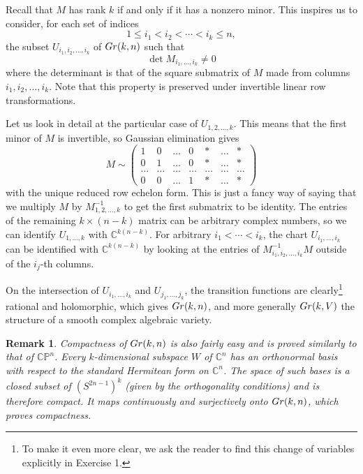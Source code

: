 \documentclass[11pt]{article}
\numberwithin{equation}{section}
\numberwithin{footnote}{section}
\newtheorem{rem}[thm]{Remark}
\newcommand{\Gr}{{\rm Gr}}
\renewcommand{\P}{{\mathbb P}}
\newcommand{\C}{{\mathbb C}}
\begin{document}
\smallskip
Recall that $M$ has rank $k$ if and only if it has a nonzero minor. This inspires us to consider, for each set of indices 
$$
1\leq i_1 < i_2 <\cdots < i_k\leq n,
$$
the subset $U_{i_1,i_2,\ldots,i_k}$ of $\Gr(k,n)$ such that
$$
\det M_{i_1,\ldots,i_k} \neq 0
$$
where the determinant is that of the square
submatrix of $M$ made from columns 
$i_1,i_2,\ldots,i_k$. Note that this property is preserved under invertible linear row transformations.

\smallskip
Let us look in detail at the particular case of $U_{1,2,\ldots,k}$. This means that the first minor of $M$ is invertible, so Gaussian elimination gives
$$
M\sim \left(
\begin{array}{ccccccc}
1 & 0 &\ldots & 0 & * &\ldots &*\\
0 & 1 &\ldots & 0 & * &\ldots &*\\
\ldots & \ldots &\ldots & \ldots & \ldots &\ldots &\ldots\\
0 & 0 &\ldots & 1 & * &\ldots &*
\end{array}
\right)
$$
with the unique reduced row echelon form. This is just a fancy way of saying that we multiply $M$ by $M_{1,2,\ldots,k}^{-1}$ to get the first submatrix to be identity. The entries of the remaining $k\times (n-k)$ matrix can be arbitrary complex numbers, so we can identify $U_{1,\ldots, k}$ with $\C^{k(n-k)}$. For arbitrary $i_1<\cdots<i_k$, the chart $U_{i_1,\ldots, i_k}$ can be identified with $\C^{k(n-k)}$ by looking at the entries of $M_{i_1,i_2,\ldots,i_k}^{-1}M$ outside of the $i_j$-th columns.

\smallskip
On the intersection of $U_{i_1,\ldots,i_k}$ and $U_{j_1,\ldots,j_k}$, the transition functions are clearly\footnote{ To make it even more clear, we ask the reader to find this change of variables explicitly in Exercise 1.} rational and holomorphic, which gives 
$\Gr(k,n)$, and more generally $\Gr(k,V)$ the structure of a smooth complex algebraic variety. 

\smallskip
\begin{rem}
Compactness of $\Gr(k,n)$ is also fairly easy and is proved similarly to that of $\C\P^n$. Every $k$-dimensional subspace $W$ of $\C^n$ has an orthonormal basis with respect to the standard Hermitean form on $\C^n$. The space of such bases is a closed subset of $(S^{2n-1})^{k}$ (given by the orthogonality conditions) and is therefore compact. It maps continuously and surjectively onto $\Gr(k,n)$, which proves compactness.
\end{rem}
\end{document}
